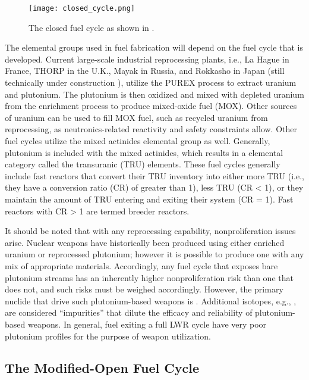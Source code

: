 \begin{figure}[]
  \begin{center}
    \texttt{[image: closed\_cycle.png]}
  \caption{The closed fuel cycle as shown in \cite{cochran1990nuclear}.}
  \label{fig:closed-cycle}
  \end{center}
\end{figure}


The elemental groups used in fuel fabrication will depend on the fuel cycle that
is developed. Current large-scale industrial reprocessing plants, i.e., La Hague
in France, THORP in the U.K., Mayak in Russia, and Rokkasho in Japan (still
technically under construction \cite{rokkasho}), utilize the PUREX process to
extract uranium and plutonium. The plutonium is then oxidized and mixed with
depleted uranium from the enrichment process to produce mixed-oxide fuel
(MOX). Other sources of uranium can be used to fill MOX fuel, such as recycled
uranium from reprocessing, as neutronics-related reactivity and safety
constraints allow. Other fuel cycles utilize the mixed actinides elemental group
as well. Generally, plutonium is included with the mixed actinides, which
results in a elemental category called the transuranic (TRU) elements. These
fuel cycles generally include fast reactors that convert their TRU inventory
into either more TRU (i.e., they have a conversion ratio (CR) of greater than
1), less TRU (CR < 1), or they maintain the amount of TRU entering and exiting
their system (CR = 1). Fast reactors with CR > 1 are termed breeder reactors.

It should be noted that with any reprocessing capability, nonproliferation
issues arise. Nuclear weapons have historically been produced using either
enriched uranium or reprocessed plutonium; however it is possible to produce one
with any mix of appropriate materials. Accordingly, any fuel cycle that exposes
bare plutonium streams has an inherently higher nonproliferation risk than one
that does not, and such risks must be weighed accordingly. However, the primary
nuclide that drive such plutonium-based weapons is . Additional
isotopes, e.g., , are considered ``impurities'' that dilute the
efficacy and reliability of plutonium-based weapons. In general, fuel exiting a
full LWR cycle have very poor plutonium profiles for the purpose of weapon
utilization.

\subsection{The Modified-Open Fuel Cycle}

